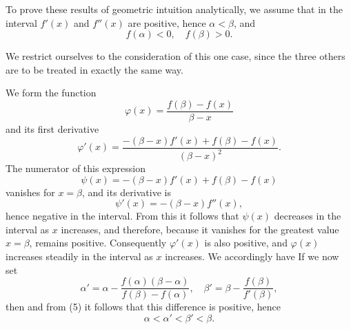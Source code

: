
To prove these results of geometric intuition analytically,
we assume that in the interval $f'(x)$ and
$f''(x)$ are positive, hence $\alpha < \beta$, and
\[
f(\alpha) < 0, \quad f(\beta) > 0.
\]

We restrict ourselves to the consideration of this one
case, since the three others are to be treated in exactly the same
way.

We form the function
\[
\varphi(x) = \frac{f(\beta) - f(x)}{\beta - x}
\]
and its first derivative
\[
\varphi'(x) = \frac{-(\beta - x)f'(x) + f(\beta) - f(x)}{(\beta - x)^2}.
\]
The numerator of this expression
\[
\psi(x) = -(\beta - x)f'(x) + f(\beta) - f(x)
\]
vanishes for $x = \beta$, and its derivative is
\[
\psi'(x) = -(\beta - x)f''(x),
\]
hence negative in the interval. From this it follows that $\psi(x)$ decreases
in the interval as $x$ increases, and therefore, because it vanishes for the
greatest value $x = \beta$, remains positive. Consequently
$\varphi'(x)$ is also positive, and $\varphi(x)$ increases steadily in the interval
as $x$ increases. We accordingly have
If we now set
\[
\alpha' = \alpha - \frac{f(\alpha)(\beta - \alpha)}{f(\beta) - f(\alpha)}, \quad \beta' = \beta - \frac{f(\beta)}{f'(\beta)},
\]
then
and from (5) it follows that this difference is positive, hence
\[
\alpha < \alpha' < \beta' < \beta.
\]
